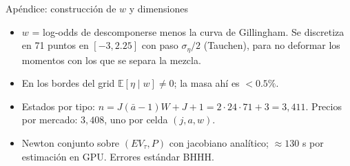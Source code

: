 \documentclass[aspectratio=169,11pt]{beamer}
\begin{document}
\begin{frame}{Apéndice: construcción de $w$ y dimensiones}
  \begin{itemize}
    \item $w$ = log-odds de descomponerse menos la curva de Gillingham. Se discretiza en 71
          puntos en $[-3,2.25]$ con paso $\sigma_\eta/2$ (Tauchen), para no deformar los
          momentos con los que se separa la mezcla.
    \item En los bordes del grid $\mathbb E[\eta\mid w]\neq0$; la masa ahí es $<0.5\%$.
    \item Estados por tipo: $n=J(\bar a-1)W+J+1 = 2\cdot 24\cdot 71+3=3{,}411$.
          Precios por mercado: $3{,}408$, uno por celda $(j,a,w)$.
    \item Newton conjunto sobre $(EV_\tau,P)$ con jacobiano analítico; $\approx 130$ s por
          estimación en GPU. Errores estándar BHHH.
  \end{itemize}
\end{frame}
\end{document}
